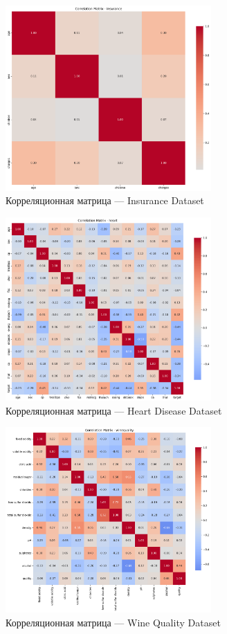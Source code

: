 \documentclass[a4paper]{article}
\begin{document}
\begin{figure}[H]
\centering
\includegraphics[width=0.7\textwidth]{images/correlation_heatmap_insurance.png}
\caption{Корреляционная матрица — Insurance Dataset}
\end{figure}

\begin{figure}[H]
\centering
\includegraphics[width=0.7\textwidth]{images/correlation_heatmap_heart.png}
\caption{Корреляционная матрица — Heart Disease Dataset}
\end{figure}

\begin{figure}[H]
\centering
\includegraphics[width=0.7\textwidth]{images/correlation_heatmap_winequality.png}
\caption{Корреляционная матрица — Wine Quality Dataset}
\end{figure}
\end{document}
